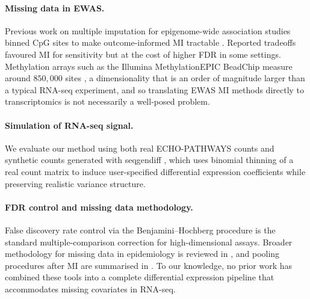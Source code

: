 \paragraph{Missing data in EWAS.} Previous work on multiple imputation for epigenome-wide association studies binned CpG sites to make outcome-informed MI tractable \cite{mill2013epigenomewide,weinhold2020statistical}. Reported tradeoffs favoured MI for sensitivity but at the cost of higher FDR in some settings. Methylation arrays such as the Illumina MethylationEPIC BeadChip measure around $850{,}000$ sites \cite{pidsley2016critical}, a dimensionality that is an order of magnitude larger than a typical RNA-seq experiment, and so translating EWAS MI methods directly to transcriptomics is not necessarily a well-posed problem.

\paragraph{Simulation of RNA-seq signal.} We evaluate our method using both real ECHO-PATHWAYS counts \cite{paulson2022lewinn} and synthetic counts generated with seqgendiff \cite{gerard2020data}, which uses binomial thinning of a real count matrix to induce user-specified differential expression coefficients while preserving realistic variance structure.

\paragraph{FDR control and missing data methodology.} False discovery rate control via the Benjamini--Hochberg procedure \cite{benjamini1995controlling} is the standard multiple-comparison correction for high-dimensional assays. Broader methodology for missing data in epidemiology is reviewed in \cite{sterne2009multiple,little2019statistical}, and pooling procedures after MI are summarised in \cite{marshall2009combining}. To our knowledge, no prior work has combined these tools into a complete differential expression pipeline that accommodates missing covariates in RNA-seq.
